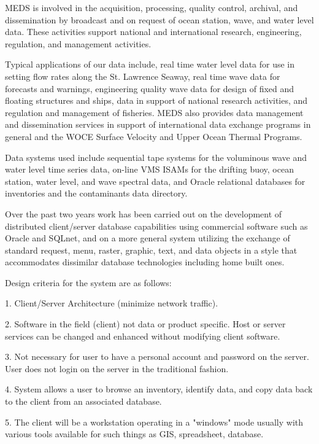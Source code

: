 \bigskip
\large
{}
\normalsize
\medskip

	MEDS is involved in the acquisition, processing, quality control, 
archival, and dissemination by broadcast and on request of ocean station, 
wave, and water level data.  These activities support national and 
international research, engineering, regulation, and management 
activities.

	Typical applications of our data include, real time water level data 
for use in setting flow rates along the St. Lawrence Seaway, real time 
wave data for forecasts and warnings, engineering quality wave data for 
design of fixed and floating structures and ships, data in support of 
national research activities, and regulation and management of fisheries.  
MEDS also provides data management and dissemination services in 
support of international data exchange programs in general and the WOCE 
Surface Velocity and Upper Ocean Thermal Programs.

	Data systems used include sequential tape systems for the 
voluminous wave and water level time series data, on-line VMS ISAMs for 
the drifting buoy, ocean station, water level, and wave spectral data, and 
Oracle relational databases for inventories and the contaminants data 
directory.

	Over the past two years work has been carried out on the 
development of distributed client/server database capabilities using 
commercial software such as Oracle and SQLnet, and on a more general 
system utilizing the exchange of standard request, menu, raster, graphic, 
text, and data objects in a style that accommodates dissimilar database 
technologies including home built ones.

Design criteria for the system are as follows:
\begin{description}
\item {1.} Client/Server Architecture (minimize network traffic).

\item {2.} Software in the field (client) not data or product specific.  Host
or server services can be changed and enhanced without modifying client
software.

\item {3.} Not necessary for user to have a personal account and password on 
the server.  User does not login on the server in the traditional fashion.

\item {4.} System allows a user to browse an inventory, identify data, and
copy data back to the client from an associated database.

\item {5.} The client will be a workstation operating in a "windows" mode 
usually with various tools available for such things as GIS, spreadsheet, 
database.
\end{description}


